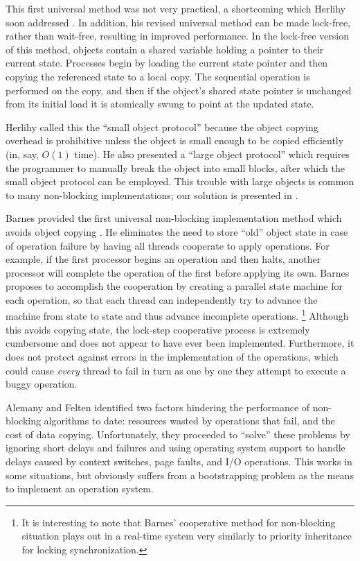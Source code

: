 \documentclass[preprint]{rdbacmconf}
\begin{document}
This first universal method was not very practical, a shortcoming
which Herlihy soon addressed \cite{Herlihy93}.  In addition, his revised universal
method can be made lock-free, rather than wait-free, resulting in
improved performance.  In the lock-free version of this method,
objects contain a shared variable
holding a pointer to their current state.  Processes begin by loading
the current state pointer and then copying the referenced state to a
local copy.  The sequential operation is performed on the
copy, and then if the object's shared state pointer is unchanged from
its initial load it is atomically swung to point at the updated state.

Herlihy called this the ``small object protocol'' because the object
copying overhead is prohibitive unless the object is small enough to
be copied efficiently (in, say, $O(1)$ time).  He also presented a
``large object protocol'' which requires the programmer to
manually break the object into small blocks, after which the small
object protocol can be employed.  This trouble with large objects is
common to many non-blocking implementations; our solution is presented
in .

Barnes provided the first universal non-blocking implementation
method which avoids object copying \cite{Barnes93}.  He eliminates the
need to store ``old'' object
state in case of operation failure by having all threads cooperate to
apply operations.  For example, if the first processor begins an operation
and then halts, another processor will complete the operation of the first
before applying its own.  Barnes proposes to accomplish the
cooperation by creating a parallel state machine for each operation,
so that each thread can independently try to advance the machine from state
to state and thus advance incomplete operations.%
\footnote{It is interesting to note that Barnes' cooperative method
  for non-blocking 
  situation plays out in a real-time system very similarly to priority
  inheritance for locking synchronization.}
Although this avoids
copying state, the lock-step cooperative process is extremely
cumbersome and does not appear to have ever been implemented.
Furthermore, it does not protect against errors in the implementation
of the operations, which could cause \emph{every} thread to fail in turn
as one by one they attempt to execute a buggy operation.

Alemany and Felten \cite{AlemanyFe92} identified two factors hindering the
performance of non-blocking algorithms to date: resources wasted by operations
that fail, and the cost of data copying.  Unfortunately, they
proceeded to
``solve'' these problems by ignoring short delays and failures and
using operating system support to handle delays caused by
context switches, page faults, and
I/O operations.  This works in some situations, but obviously suffers
from a bootstrapping problem as the means to implement an operation system.
\end{document}
